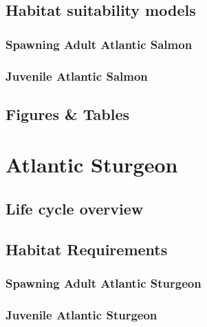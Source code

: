 \documentclass[
]{book}
\begin{document}
\hypertarget{habitat-suitability-models-3}{%
\section{Habitat suitability models}\label{habitat-suitability-models-3}}

\hypertarget{spawning-adult-atlantic-salmon-1}{%
\subsection{Spawning Adult Atlantic Salmon}\label{spawning-adult-atlantic-salmon-1}}

\hypertarget{juvenile-atlantic-salmon-1}{%
\subsection{Juvenile Atlantic Salmon}\label{juvenile-atlantic-salmon-1}}

\hypertarget{figures-tables-3}{%
\section{Figures \& Tables}\label{figures-tables-3}}

\hypertarget{atlantic-sturgeon}{%
\chapter{Atlantic Sturgeon}\label{atlantic-sturgeon}}

\hypertarget{life-cycle-overview-4}{%
\section{Life cycle overview}\label{life-cycle-overview-4}}

\hypertarget{habitat-requirements-4}{%
\section{Habitat Requirements}\label{habitat-requirements-4}}

\hypertarget{spawning-adult-atlantic-sturgeon}{%
\subsection{Spawning Adult Atlantic Sturgeon}\label{spawning-adult-atlantic-sturgeon}}

\hypertarget{juvenile-atlantic-sturgeon}{%
\subsection{Juvenile Atlantic Sturgeon}\label{juvenile-atlantic-sturgeon}}
\end{document}
